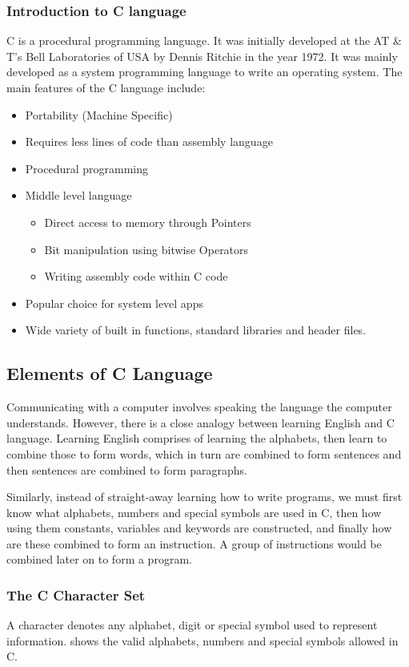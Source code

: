 \subsubsection{Introduction to C language}
C is a procedural programming language. It was initially developed at the AT \& T's Bell Laboratories of USA by Dennis Ritchie in the year 1972. It was mainly developed as a system programming language to write an operating system. The main features of the C language include: 
\begin{itemize}
    \item Portability (Machine Specific)
    \item Requires less lines of code than assembly language
    \item Procedural programming
    \item Middle level language   
    \begin{itemize}
        \item Direct access to memory through Pointers
        \item Bit manipulation using bitwise Operators
        \item Writing assembly code within C code
    \end{itemize}
    \item Popular choice for system level apps
    \item Wide variety of built in functions, standard libraries and header files.
\end{itemize}


\subsection{Elements of C Language}
Communicating with a computer involves speaking the language the computer understands. However, there is a close analogy between learning English and C language. Learning English comprises of learning the alphabets, then learn to combine those to form words, which in turn are combined to form sentences and then sentences are combined to form paragraphs.

\par Similarly, instead of straight-away learning how to write programs, we must first know what alphabets, numbers and special symbols are used in C, then how using them constants, variables and keywords are constructed, and finally how are these combined to form an instruction. A group of instructions would be combined later on to form a program. 

\subsubsection{The C Character Set}
A character denotes any alphabet, digit or special symbol used to represent information.  shows the valid alphabets, numbers and special symbols allowed in C.

